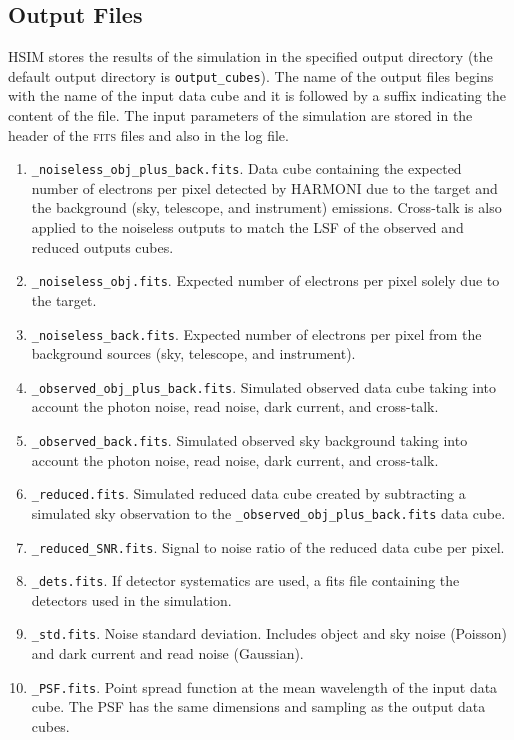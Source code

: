 \documentclass[12pt]{report}
\begin{document}
\subsection{Output Files}\label{s:output}

HSIM stores the results of the simulation in the specified output directory (the default output directory is \texttt{output\_cubes}). The name of the output files begins with the name of the input data cube and it is followed by a suffix indicating the content of the file. The input parameters of the simulation are stored in the header of the \textsc{fits} files and also in the log file.

\begin{enumerate}
\setlength\itemsep{-0.5ex}
\item \texttt{\_noiseless\_obj\_plus\_back.fits}. Data cube containing the expected number of electrons per pixel detected by HARMONI due to the target and the background (sky, telescope, and instrument) emissions. Cross-talk is also applied to the noiseless outputs to match the LSF of the observed and reduced outputs cubes.
\item \texttt{\_noiseless\_obj.fits}. Expected number of electrons per pixel solely due to the target.
\item \texttt{\_noiseless\_back.fits}. Expected number of electrons per pixel from the background sources (sky, telescope, and instrument).
\item \texttt{\_observed\_obj\_plus\_back.fits}. Simulated observed data cube taking into account the photon noise, read noise, dark current, and cross-talk.
\item \texttt{\_observed\_back.fits}. Simulated observed sky background taking into account the photon noise, read noise, dark current, and cross-talk.
\item \texttt{\_reduced.fits}. Simulated reduced data cube created by subtracting a simulated sky observation  to the \texttt{\_observed\_obj\_plus\_back.fits} data cube.
\item \texttt{\_reduced\_SNR.fits}. Signal to noise ratio of the reduced data cube per pixel.
\item \texttt{\_dets.fits}. If detector systematics are used, a fits file containing the detectors used in the simulation.
\item \texttt{\_std.fits}. Noise standard deviation. Includes object and sky noise (Poisson) and dark current and read noise (Gaussian).
\item \texttt{\_PSF.fits}. Point spread function at the mean wavelength of the input data cube. The PSF has the same dimensions and sampling as the output data cubes.

\end{enumerate}
\end{document}
